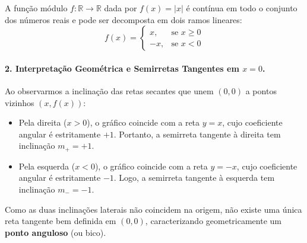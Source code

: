 A função módulo $f:\mathbb{R} \to \mathbb{R}$ dada por $f(x) = |x|$ é contínua em todo o conjunto dos números reais e pode ser decomposta em dois ramos lineares:
\[
f(x) = \begin{cases}
x, & \text{se } x \ge 0 \\
-x, & \text{se } x < 0
\end{cases}
\]

\begin{center}
\end{center}

\paragraph{2. Interpretação Geométrica e Semirretas Tangentes em $x = 0$.}

Ao observarmos a inclinação das retas secantes que unem $(0, 0)$ a pontos vizinhos $(x, f(x))$:
\begin{itemize}[noitemsep, topsep=2pt]
    \item Pela direita ($x > 0$), o gráfico coincide com a reta $y = x$, cujo coeficiente angular é estritamente $+1$. Portanto, a semirreta tangente à direita tem inclinação $m_+ = +1$.
    \item Pela esquerda ($x < 0$), o gráfico coincide com a reta $y = -x$, cujo coeficiente angular é estritamente $-1$. Logo, a semirreta tangente à esquerda tem inclinação $m_- = -1$.
\end{itemize}
Como as duas inclinações laterais não coincidem na origem, não existe uma única reta tangente bem definida em $(0, 0)$, caracterizando geometricamente um \textbf{ponto anguloso} (ou bico).

